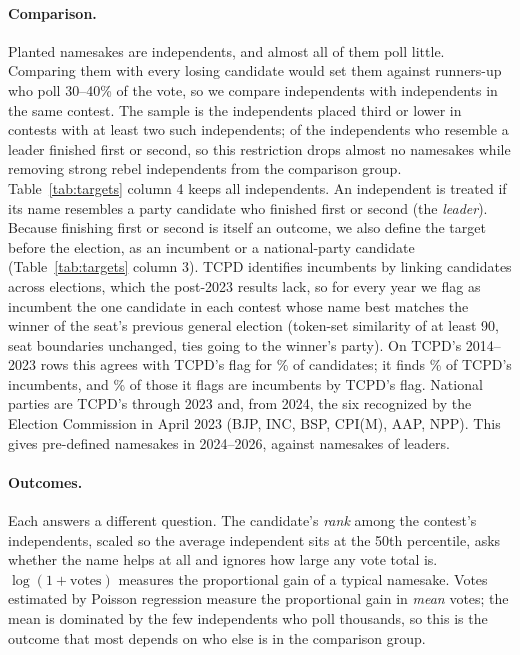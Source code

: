 \documentclass[11pt]{article}
\begin{document}
\paragraph{Comparison.} Planted namesakes are independents, and almost all of them poll little. Comparing them with every losing candidate would set them against runners-up who poll 30--40\% of the vote, so we compare independents with independents in the same contest. The sample is the \nInd{} independents placed third or lower in \nIndContests{} contests with at least two such independents; \nTreatedTopTwo{} of the \nTreatedAll{} independents who resemble a leader finished first or second, so this restriction drops almost no namesakes while removing strong rebel independents from the comparison group. Table~\ref{tab:targets} column 4 keeps all independents. An independent is treated if its name resembles a party candidate who finished first or second (the \emph{leader}). Because finishing first or second is itself an outcome, we also define the target before the election, as an incumbent or a national-party candidate (Table~\ref{tab:targets} column 3). TCPD identifies incumbents by linking candidates across elections, which the post-2023 results lack, so for every year we flag as incumbent the one candidate in each contest whose name best matches the winner of the seat's previous general election (token-set similarity of at least 90, seat boundaries unchanged, ties going to the winner's party). On TCPD's 2014--2023 rows this agrees with TCPD's flag for \incAgree\% of candidates; it finds \incRecall\% of TCPD's incumbents, and \incPrecision\% of those it flags are incumbents by TCPD's flag. National parties are TCPD's through 2023 and, from 2024, the six recognized by the Election Commission in April 2023 (BJP, INC, BSP, CPI(M), AAP, NPP). This gives \nExanteLate{} pre-defined namesakes in 2024--2026, against \nLeaderLate{} namesakes of leaders.

\paragraph{Outcomes.} Each answers a different question. The candidate's \emph{rank} among the contest's independents, scaled so the average independent sits at the 50th percentile, asks whether the name helps at all and ignores how large any vote total is. $\log(1+\text{votes})$ measures the proportional gain of a typical namesake. Votes estimated by Poisson regression measure the proportional gain in \emph{mean} votes; the mean is dominated by the few independents who poll thousands, so this is the outcome that most depends on who else is in the comparison group.
\end{document}
